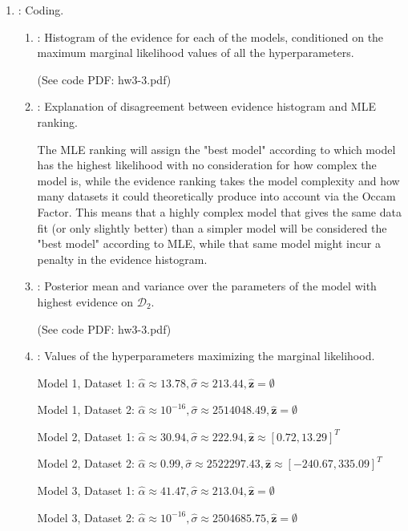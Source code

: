 \documentclass[11pt]{article}
\newcommand{\mbf}[1]{{\boldsymbol{\mathbf{#1}}}}
\renewcommand{\bm}{\mbf}
\begin{document}
\begin{enumerate}
\begin{enumerate}[label=(\alph*)]
    \end{enumerate}

    \item: Coding.
    
    \begin{enumerate}
        \item: Histogram of the evidence for each of the models, conditioned on the maximum marginal likelihood values of all the hyperparameters.

            (See code PDF: hw3-3.pdf)

        \item: Explanation of disagreement between evidence histogram and MLE ranking.

            The MLE ranking will assign the "best model" according to which model has the highest likelihood with no consideration for how complex the model is, while the evidence ranking takes the model complexity and how many datasets it could theoretically produce into account via the Occam Factor. This means that a highly complex model that gives the same data fit (or only slightly better) than a simpler model will be considered the "best model" according to MLE, while that same model might incur a penalty in the evidence histogram.

        \item: Posterior mean and variance over the parameters of the model with highest evidence on $\mathcal{D}_2$.

            (See code PDF: hw3-3.pdf)

        \item: Values of the hyperparameters maximizing the marginal likelihood.

        Model 1, Dataset 1: $\hat{\alpha} \approx 13.78, \hat{\sigma} \approx 213.44, \hat{\bm{z}} = \emptyset$

        Model 1, Dataset 2: $\hat{\alpha} \approx 10^{-16}, \hat{\sigma} \approx 2514048.49, \hat{\bm{z}} = \emptyset$

        Model 2, Dataset 1: $\hat{\alpha} \approx 30.94, \hat{\sigma} \approx 222.94, \hat{\bm{z}} \approx [0.72, 13.29]^T$

        Model 2, Dataset 2: $\hat{\alpha} \approx 0.99, \hat{\sigma} \approx 2522297.43, \hat{\bm{z}} \approx [-240.67, 335.09]^T$

        Model 3, Dataset 1: $\hat{\alpha} \approx 41.47, \hat{\sigma} \approx 213.04, \hat{\bm{z}} = \emptyset$

        Model 3, Dataset 2: $\hat{\alpha} \approx 10^{-16}, \hat{\sigma} \approx 2504685.75, \hat{\bm{z}} = \emptyset$

    \end{enumerate}

\end{enumerate}
\end{document}
